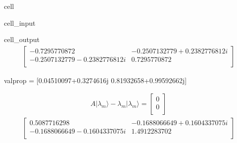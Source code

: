 \documentclass[letterpaper,10pt,english]{jupyterBook}
\begin{document}
\begin{sphinxuseclass}{cell}
\begin{sphinxVerbatimInput}
\begin{sphinxuseclass}{cell_input}
\begin{sphinxVerbatim}[commandchars=\\\{\}]

\end{sphinxVerbatim}

\end{sphinxuseclass}\end{sphinxVerbatimInput}
\begin{sphinxVerbatimOutput}

\begin{sphinxuseclass}{cell_output}\begin{equation*}
\begin{split}\begin{bmatrix}
-0.7295770872 & -0.2507132779 + 0.2382776812 i  \\
 -0.2507132779 - 0.2382776812 i & 0.7295770872  \\
 \end{bmatrix}
\end{split}
\end{equation*}
\begin{sphinxVerbatim}[commandchars=\\\{\}]
valprop = [0.04510097+0.3274616j  0.81932658+0.99592662j]
\end{sphinxVerbatim}
\begin{equation*}
\begin{split}
A|\lambda_m \rangle -\lambda_m |\lambda_m\rangle =  
\begin{bmatrix}
0  \\
 0  \\
 \end{bmatrix}
\end{split}
\end{equation*}\begin{equation*}
\begin{split}\begin{bmatrix}
0.5087716298 & -0.1688066649 + 0.1604337075 i  \\
 -0.1688066649 - 0.1604337075 i & 1.4912283702  \\
 \end{bmatrix}
\end{split}
\end{equation*}
\end{sphinxuseclass}\end{sphinxVerbatimOutput}

\end{sphinxuseclass}
\end{document}
